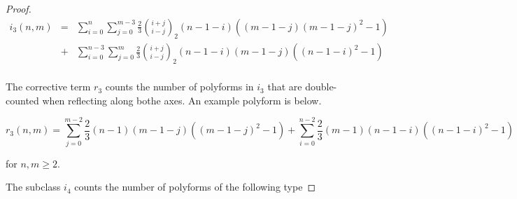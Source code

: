 \documentclass[12pt]{article}
\theoremstyle{plain}
\theoremstyle{definition}
\theoremstyle{remark}
\theoremstyle{definition}
\newcommand{\cellw}[4]{\draw[thick] ( #1 , #2 ) rectangle ( #3 , #4 );}
\newcommand{\cellb}[4]{\filldraw[black!60] ( #1 , #2 ) rectangle ( #3 , #4 ); \draw[thick] ( #1 , #2 ) rectangle ( #3 , #4 );}
\begin{document}
\begin{proof}
\begin{eqnarray*}
    i_3(n,m) & = & \sum_{i=0}^{n}\sum_{j=0}^{m-3} \frac{2}{3}\binom{i+j}{i-j}_2 (n-1-i)((m-1-j)(m-1-j)^2-1) \\
    & + & \sum_{i=0}^{n-3}\sum_{j=0}^{m} \frac{2}{3} \binom{i+j}{i-j}_2 (n-1-i)(m-1-j)((n-1-i)^2 -1) \\
\end{eqnarray*}

The corrective term $r_3$ counts the number of polyforms in $i_3$ that are double-counted when reflecting along bothe axes. An example polyform is below.

\begin{center}
\end{center}

\begin{equation*}
    r_3(n,m) = \sum_{j=0}^{m-2}\frac{2}{3}(n-1)(m-1-j)((m-1-j)^2 -1) + \sum_{i=0}^{n-2}\frac{2}{3}(m-1)(n-1-i)((n-1-i)^2 -1)
\end{equation*}

for $n,m \geq 2.$

The subclass $i_4$ counts the number of polyforms of the following type


\end{proof}
\end{document}
